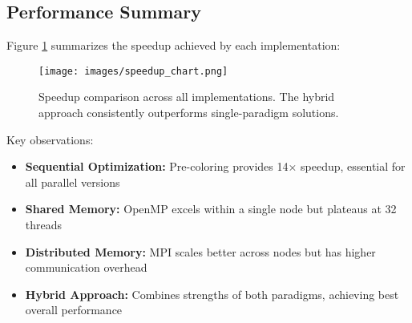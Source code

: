 \subsection{Performance Summary}
Figure \ref{fig:speedup_comparison} summarizes the speedup achieved by each implementation:

\begin{figure}[htbp]
\centering
\texttt{[image: images/speedup\_chart.png]}
\caption{Speedup comparison across all implementations. The hybrid approach consistently outperforms single-paradigm solutions.}
\label{fig:speedup_comparison}
\end{figure}

Key observations:
\begin{itemize}
    \item \textbf{Sequential Optimization:} Pre-coloring provides 14× speedup, essential for all parallel versions
    \item \textbf{Shared Memory:} OpenMP excels within a single node but plateaus at 32 threads
    \item \textbf{Distributed Memory:} MPI scales better across nodes but has higher communication overhead
    \item \textbf{Hybrid Approach:} Combines strengths of both paradigms, achieving best overall performance
\end{itemize}